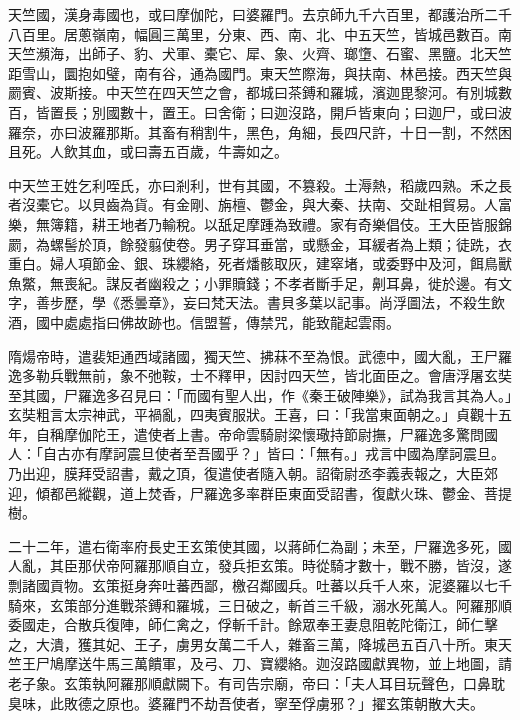 \begin{pinyinscope}
 天竺國，漢身毒國也，或曰摩伽陀，曰婆羅門。去京師九千六百里，都護治所二千八百里。居蔥嶺南，幅圓三萬里，分東、西、南、北、中五天竺，皆城邑數百。南天竺瀕海，出師子、豹、犬軍、橐它、犀、象、火齊、瑯墯、石蜜、黑鹽。北天竺距雪山，圜抱如璧，南有谷，通為國門。東天竺際海，與扶南、林邑接。西天竺與罽賓、波斯接。中天竺在四天竺之會，都城曰茶鎛和羅城，濱迦毘黎河。有別城數百，皆置長；別國數十，置王。曰舍衛；曰迦沒路，開戶皆東向；曰迦尸，或曰波羅奈，亦曰波羅那斯。其畜有稍割牛，黑色，角細，長四尺許，十日一割，不然困且死。人飲其血，或曰壽五百歲，牛壽如之。



 中天竺王姓乞利咥氏，亦曰剎利，世有其國，不篡殺。土溽熱，稻歲四熟。禾之長者沒橐它。以貝齒為貨。有金剛、旃檀、鬱金，與大秦、扶南、交趾相貿易。人富樂，無簿籍，耕王地者乃輸稅。以舐足摩踵為致禮。家有奇樂倡伎。王大臣皆服錦罽，為螺髻於頂，餘發翦使卷。男子穿耳垂當，或懸金，耳緩者為上類；徒跣，衣重白。婦人項節金、銀、珠纓絡，死者燔骸取灰，建窣堵，或委野中及河，餌鳥獸魚鱉，無喪紀。謀反者幽殺之；小罪贖錢；不孝者斷手足，劓耳鼻，徙於邊。有文字，善步歷，學《悉曇章》，妄曰梵天法。書貝多葉以記事。尚浮圖法，不殺生飲酒，國中處處指曰佛故跡也。信盟誓，傳禁咒，能致龍起雲雨。



 隋煬帝時，遣裴矩通西域諸國，獨天竺、拂菻不至為恨。武德中，國大亂，王尸羅逸多勒兵戰無前，象不弛鞍，士不釋甲，因討四天竺，皆北面臣之。會唐浮屠玄奘至其國，尸羅逸多召見曰：「而國有聖人出，作《秦王破陣樂》，試為我言其為人。」玄奘粗言太宗神武，平禍亂，四夷賓服狀。王喜，曰：「我當東面朝之。」貞觀十五年，自稱摩伽陀王，遣使者上書。帝命雲騎尉梁懷璥持節尉撫，尸羅逸多驚問國人：「自古亦有摩訶震旦使者至吾國乎？」皆曰：「無有。」戎言中國為摩訶震旦。乃出迎，膜拜受詔書，戴之頂，復遣使者隨入朝。詔衛尉丞李義表報之，大臣郊迎，傾都邑縱觀，道上焚香，尸羅逸多率群臣東面受詔書，復獻火珠、鬱金、菩提樹。



 二十二年，遣右衛率府長史王玄策使其國，以蔣師仁為副；未至，尸羅逸多死，國人亂，其臣那伏帝阿羅那順自立，發兵拒玄策。時從騎才數十，戰不勝，皆沒，遂剽諸國貢物。玄策挺身奔吐蕃西鄙，檄召鄰國兵。吐蕃以兵千人來，泥婆羅以七千騎來，玄策部分進戰茶鎛和羅城，三日破之，斬首三千級，溺水死萬人。阿羅那順委國走，合散兵復陣，師仁禽之，俘斬千計。餘眾奉王妻息阻乾陀衛江，師仁擊之，大潰，獲其妃、王子，虜男女萬二千人，雜畜三萬，降城邑五百八十所。東天竺王尸鳩摩送牛馬三萬饋軍，及弓、刀、寶纓絡。迦沒路國獻異物，並上地圖，請老子象。玄策執阿羅那順獻闕下。有司告宗廟，帝曰：「夫人耳目玩聲色，口鼻耽臭味，此敗德之原也。婆羅門不劫吾使者，寧至俘虜邪？」擢玄策朝散大夫。




\end{pinyinscope}
